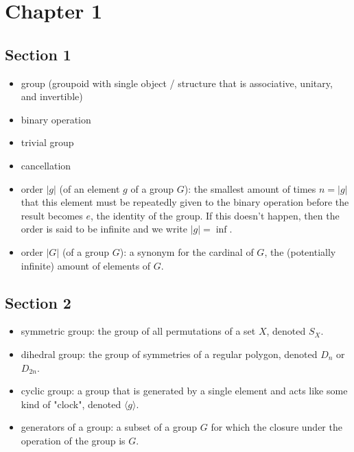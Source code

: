 \chapter*{Chapter 1}

\section*{Section 1}

\begin{itemize}
	\item group (groupoid with single object / structure that is associative, unitary, and invertible)
	\item binary operation
	\item trivial group
	\item cancellation
	\item order $|g|$ (of an element $g$ of a group $G$): the smallest amount of times $n = |g|$ that this element must be repeatedly given to the binary operation before the result becomes $e$, the identity of the group. If this doesn't happen, then the order is said to be infinite and we write $|g| = \inf$.
	\item order $|G|$ (of a group $G$): a synonym for the cardinal of $G$, the (potentially infinite) amount of elements of $G$.
\end{itemize}


\section*{Section 2}

\begin{itemize}
	\item symmetric group: the group of all permutations of a set $X$, denoted $S_X$.
	\item dihedral group: the group of symmetries of a regular polygon, denoted $D_n$ or $D_{2n}$.
	\item cyclic group: a group that is generated by a single element and acts like some kind of "clock", denoted $\langle g \rangle$.
	\item generators of a group: a subset of a group $G$ for which the closure under the operation of the group is $G$.
\end{itemize}
